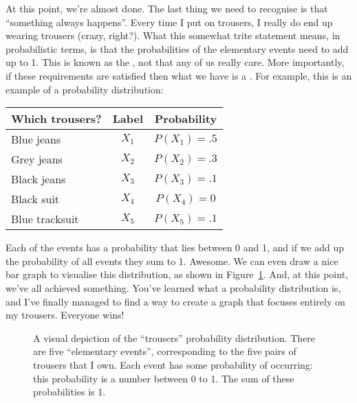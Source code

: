 At this point, we're almost done. The last thing we need to recognise is that ``something always happens''. Every time I put on trousers, I really do end up wearing trousers (crazy, right?). What this somewhat trite statement means, in probabilistic terms, is that the probabilities of the elementary events need to add up to 1. This is known as the , not that any of us really care. More importantly, if these requirements are satisfied then what we have is a . For example, this is an example of a probability distribution:
\begin{center}
\begin{tabular}{lcc} 
Which trousers?     &  Label & Probability \\ \hline
Blue jeans &  $X_1$ & $P(X_1) = .5 $ \\
Grey jeans  &  $X_2$ & $P(X_2) = .3 $ \\
Black jeans      &  $X_3$ & $P(X_3) = .1 $ \\
Black suit       &  $X_4$ & $P(X_4) = 0  $ \\
Blue tracksuit  &  $X_5$ & $P(X_5) = .1 $ \\
\end{tabular}
\end{center}
Each of the events has a probability that lies between 0 and 1, and if we add up the probability of all events they sum to 1. Awesome. We can even draw a nice bar graph to visualise this distribution, as shown in Figure~\ref{fig:pantsprob}. And, at this point, we've all achieved something. You've learned what a probability distribution is, and I've finally managed to find a way to create a graph that focuses entirely on my trousers. Everyone wins!

\begin{figure}[!!htb]
\begin{center}
\caption{A visual depiction of the ``trousers'' probability distribution. There are five ``elementary events'', corresponding to the five pairs of trousers that I own. Each event has some probability of occurring: this probability is a number between 0 to 1. The sum of these probabilities is 1.}
\label{fig:pantsprob}
\HR
\end{center}
\end{figure}

